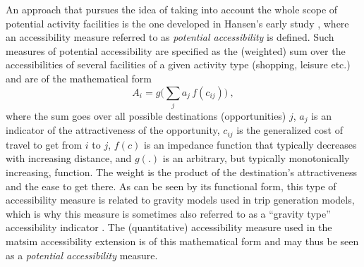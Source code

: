 An approach that pursues the idea of taking into account the whole scope of potential activity facilities is the one 
developed in Hansen's early study \citep{Hansen1959HowAccessibilityShapesLandUse}, where an accessibility 
measure referred to as \textit{potential accessibility} is defined. Such measures of potential accessibility are 
specified as the (weighted) sum over the 
accessibilities of several facilities of a given activity type (\eg shopping, leisure etc.) and are of the mathematical form
\begin{equation}
	A_i = g\Big( \sum_j a_j \, f(c_{ij}) \Big) \ ,
	\label{eq:accessibility:basic}
\end{equation}
where the sum goes over all possible destinations (opportunities) $j$, $a_j$ is an indicator of the attractiveness of 
the opportunity, $c_{ij}$ is the generalized cost of travel to get from $i$ to $j$, $f(c)$ is an impedance function 
that typically decreases with increasing distance, and $g(.)$ is an arbitrary, but typically monotonically increasing, 
function. 
The weight is the product of the destination's attractiveness and the ease to get there. As can be seen by its 
functional form, this type of accessibility measure is related to gravity models used in trip generation models, which 
is why this measure is sometimes also referred to as a ``gravity type'' accessibility indicator 
\citep{MorrisEtAl1978AccessibilityIndicators}. The (quantitative) accessibility measure used in the \gls{matsim} 
accessibility extension is of this mathematical form and may thus be seen as a \textit{potential accessibility} measure.



